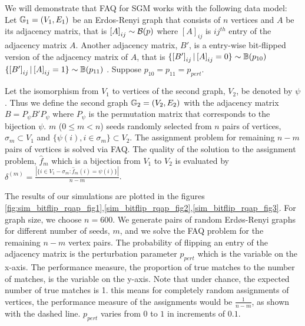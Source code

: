 \documentclass[12pt,oneside,final]{thesis}\usepackage[]{graphicx}\usepackage[]{color}
\begin{document}
We will demonstrate that  FAQ for SGM works with the following data model:
Let $\mathbb{G}_1=(V_1,E_1)$ be an Erdos-Renyi graph that consists of $n$ vertices and $A$ be its adjacency matrix,  that is
  $\left[A\right]_{ij} \sim \mathcal{B}(p)$ where $\left[A\right]_{ij}$ is ${ij}^{th}$ entry of the adjacency matrix  $A$. Another adjacency matrix, $B'$, is a entry-wise bit-flipped version of the adjacency matrix of $A$, that is
    $\{\left[B' \right]_{ij}|\left[A\right]_{ij}=0 \} \sim \mathbb{B}(p_{10})$ $\{\left[B'\right]_{ij}|\left[A\right]_{ij}=1 \} \sim \mathbb{B}(p_{11})$  . Suppose $p_{10}=p_{11}=p_{pert}$.
    
    Let the isomorphism from  $V_1$ to vertices of the second graph, $V_2$, be denoted by $\psi$. Thus we define the second graph $\mathbb{G}_2=(V_2,E_2)$ with the adjacency matrix $B=P_{\psi}B'P_{\psi}$ where $P_{\psi}$ is the permutation matrix that corresponds to the bijection $\psi$. $m$ ($0\leq m<n$) seeds randomly selected from $n$ pairs of vertices, $\sigma_m \subset V_1$  and  $\{\psi(i), i \in \sigma_m \}\subset V_2 $. The assignment problem for remaining $n-m$ pairs of vertices is solved via FAQ. The quality of the solution to the assignment problem, $\hat{f}_m$ which is a bijection from  $V_1$ to  $V_2$ is evaluated  by  $\delta^{(m)} = \frac{|\{i\in V_1-\sigma_m: \hat{f}_m(i)=\psi(i)\}|}{n-m}$.
  
  The results of our simulations are plotted in the figures \ref{fig:sim_bitflip_rqap_fig1},\ref{sim_bitflip_rqap_fig2},\ref{sim_bitflip_rqap_fig3}. For graph size, we choose $n=600$. We generate pairs of random Erd\o s-Renyi graphs  for different number of seeds, $m$, and  we solve the FAQ problem for the remaining $n-m$ vertex pairs. The probability of flipping an entry of the adjacency matrix is the perturbation parameter $p_{pert}$ which is the variable on the x-axis. The performance measure, the proportion of true matches to the number of matches, is the variable on the y-axis.
  Note that 
  under chance, the expected number of true matches is 1. this means for completely random assignments of vertices, the performance measure of the assignments would be $\frac{1}{n-m}$, as shown with the dashed line.  $p_{pert}$ varies from $0$ to $1$ in increments of $0.1$. 
\end{document}
